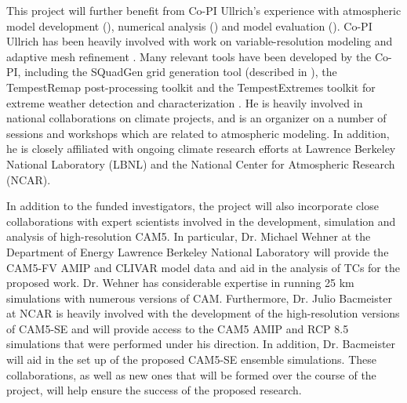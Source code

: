 \documentclass[11pt]{article}
\begin{document}
This project will further benefit from Co-PI Ullrich's experience with atmospheric model development  (\cite{ullrich2010high, PHLPAURDN2011SPRINGER, ullrich2012operator, ullrich2012mcore, ullrich2014fluxform, guba2014viscosity, ullrich2014understanding, ullrich2014global}), numerical analysis (\cite{ullrich2011analysis, ullrich2012considerations}) and model evaluation (\cite{DCMIP2012TESTCASES, ullrich2014proposed, kent2013dynamical, ullrich2014baroclinic}).  Co-PI Ullrich has been heavily involved with work on variable-resolution modeling \citep{zarzycki2014aquaplanet} and adaptive mesh refinement \citep{collins2013nonhydrostatic, mccorquodale2014adaptive}. Many relevant tools have been developed by the Co-PI, including the SQuadGen grid generation tool (described in \cite{guba2014viscosity}), the TempestRemap post-processing toolkit \citep{ullrich2015remapping} and the TempestExtremes toolkit for extreme weather detection and characterization \citep{ullrich2015extremes}. He is heavily involved in national collaborations on climate projects, and is an organizer on a number of sessions and workshops which are related to atmospheric modeling. In addition, he is closely affiliated with ongoing climate research efforts at Lawrence Berkeley National Laboratory (LBNL) and the National Center for Atmospheric Research (NCAR).

In addition to the funded investigators, the project will also incorporate close collaborations with expert scientists involved in the development, simulation and analysis of high-resolution CAM5.  In particular, Dr. Michael Wehner at the Department of Energy Lawrence Berkeley National Laboratory will provide the CAM5-FV AMIP and CLIVAR model data and aid in the analysis of TCs for the proposed work.  Dr. Wehner has considerable expertise in running 25 km simulations with numerous versions of CAM. Furthermore, Dr. Julio Bacmeister at NCAR is heavily involved with the development of the high-resolution versions of CAM5-SE and will provide access to the CAM5 AMIP and RCP 8.5 simulations that were performed under his direction.  In addition, Dr. Bacmeister will aid in the set up of the proposed CAM5-SE ensemble simulations. These collaborations, as well as new ones that will be formed over the course of the project, will help ensure the success of the proposed research. 

{\vbox{}}

\end{document}
